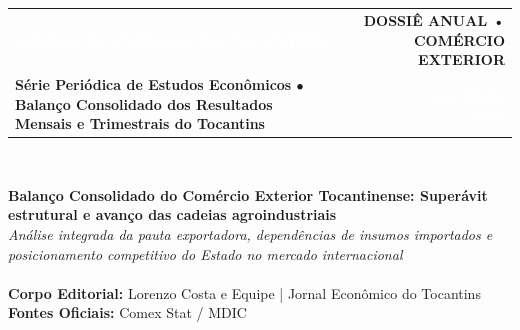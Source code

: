 \documentclass[10pt,a4paper]{article}
\begin{document}
\color{cinzatexto}

\\[-4pt]
\noindent{\color{douradoto}\rule{\textwidth}{1.2pt}}\\[-1pt]
\noindent\colorbox{corprimaria}{%
  \parbox{\dimexpr\textwidth-2\fboxsep\relax}{%
    \vspace{7pt}%
    \begin{tabularx}{\linewidth}{@{}X r@{}}
      {\fontsize{16}{19}\selectfont\textbf{\textcolor{white}{JORNAL ECONÔMICO DO TOCANTINS}}} &
      \colorbox{douradoto}{\textbf{\footnotesize\textcolor{corprimaria}{\hspace{6pt}DOSSIÊ ANUAL • COMÉRCIO EXTERIOR\hspace{6pt}}}} \\[5pt]
      {\footnotesize\textcolor{douradoto}{\textbf{Série Periódica de Estudos Econômicos $\bullet$ Balanço Consolidado dos Resultados Mensais e Trimestrais do Tocantins}}} &
      {\footnotesize\textcolor{white}{Referência: \textbf{Consolidado 2026}}}
    \end{tabularx}%
    \vspace{5pt}%
  }%
}\\[-2pt]
\noindent{\color{douradoto}\rule{\textwidth}{2.6pt}}

\vspace{6pt}

{\fontsize{16}{20}\selectfont\textbf{\textcolor{corprimaria}{Balanço Consolidado do Comércio Exterior Tocantinense: Superávit estrutural e avanço das cadeias agroindustriais}}}\\[4pt]
{\normalsize\textcolor{cinzasuave}{\textit{Análise integrada da pauta exportadora, dependências de insumos importados e posicionamento competitivo do Estado no mercado internacional}}}\\[5pt]
\noindent{\color{borda}\rule{\textwidth}{0.5pt}}\\[-1pt]
{\footnotesize\textcolor{corprimaria}{\textbf{Corpo Editorial:}} \textcolor{cinzatexto}{Lorenzo Costa e Equipe | Jornal Econômico do Tocantins} \hfill \textcolor{corprimaria}{\textbf{Fontes Oficiais:}} \textcolor{cinzatexto}{Comex Stat / MDIC}}\\[-3pt]
\noindent{\color{borda}\rule{\textwidth}{0.5pt}}
\end{document}
